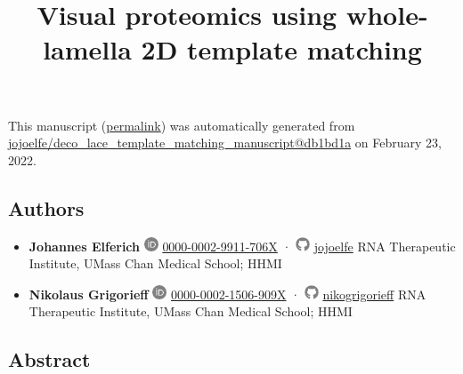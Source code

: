 \documentclass[
]{article}
\title{Visual proteomics using whole-lamella 2D template matching}
\author{}
\date{}
\begin{document}
\maketitle

This manuscript
(\href{https://jojoelfe.github.io/deco_lace_template_matching_manuscript/v/db1bd1a285c0519196fc92fb04c4ad271adf3006/}{permalink})
was automatically generated
from \href{https://github.com/jojoelfe/deco_lace_template_matching_manuscript/tree/db1bd1a285c0519196fc92fb04c4ad271adf3006}{jojoelfe/deco\_lace\_template\_matching\_manuscript@db1bd1a}
on February 23, 2022.

\hypertarget{authors}{%
\subsection{Authors}\label{authors}}

\begin{itemize}
\item
  \textbf{Johannes Elferich}
  \includegraphics[width=0.16667in,height=0.16667in]{images/orcid.pdf}
  \href{https://orcid.org/0000-0002-9911-706X}{0000-0002-9911-706X}
  · \includegraphics[width=0.16667in,height=0.16667in]{images/github.pdf}
  \href{https://github.com/jojoelfe}{jojoelfe}
  RNA Therapeutic Institute, UMass Chan Medical School; HHMI
\item
  \textbf{Nikolaus Grigorieff}
  \includegraphics[width=0.16667in,height=0.16667in]{images/orcid.pdf}
  \href{https://orcid.org/0000-0002-1506-909X}{0000-0002-1506-909X}
  · \includegraphics[width=0.16667in,height=0.16667in]{images/github.pdf}
  \href{https://github.com/nikogrigorieff}{nikogrigorieff}
  RNA Therapeutic Institute, UMass Chan Medical School; HHMI
\end{itemize}

\hypertarget{abstract}{%
\subsection{Abstract}\label{abstract}}
\end{document}
